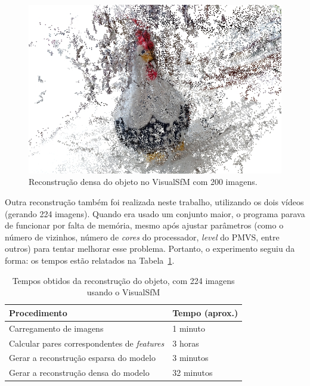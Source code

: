 \begin{figure}[!h]
	\centering
	\includegraphics[width=\linewidth]{figs/galinhadense.jpg}
	\caption{%
	Reconstrução densa do objeto no VisualSfM com 200 imagens.
	}\label{fig:reconstrucaoDensaVisualSFM}
\end{figure}

Outra reconstrução também foi realizada neste trabalho, utilizando os dois
vídeos (gerando 224 imagens).  Quando era usado um conjunto maior, o programa
parava de funcionar por falta de memória, mesmo após ajustar parâmetros (como o
número de vizinhos, número de \emph{cores} do processador, \emph{level} do PMVS,
entre outros) para tentar melhorar esse problema. Portanto, o experimento seguiu da
forma: os tempos estão relatados na Tabela~\ref{tab:temposSfM224}.
\begin{table}[h!]
\caption{Tempos obtidos da reconstrução do objeto, com 224 imagens usando o VisualSfM}
\label{tab:temposSfM224}
\begin{tabular}{|l|p{4.7cm}|}
\hline
Procedimento & Tempo (aprox.) \\ \hline
Carregamento de imagens & 1 minuto \\ \hline
Calcular pares correspondentes de \emph{features} & 3 horas \\ \hline
Gerar a reconstrução esparsa do modelo & 3 minutos \\ \hline
Gerar a reconstrução densa do modelo & 32 minutos \\ \hline
\end{tabular}
\end{table}

